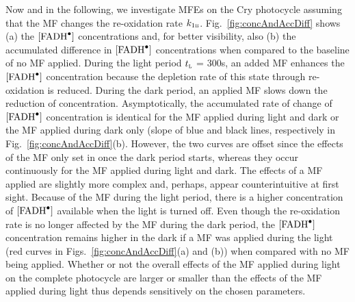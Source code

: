 \documentclass[twoside,twocolumn,9pt]{article}
\begin{document}
Now and in the following, we investigate MFEs on the Cry photocycle assuming that the MF changes the re-oxidation rate
$k_{1\textsc{b}}$. Fig.~\ref{fig:concAndAccDiff} shows (a) the $[\ce{FADH^{.}}]$ concentrations and, for better visibility, also (b)
the accumulated difference in $[\ce{FADH^{.}}]$ concentrations when compared to the baseline of no MF applied. During the light
period $t_{\textsc{l}}$ = 300s, an added MF enhances the $[\ce{FADH^{.}}]$ concentration because the depletion rate of this state
through re-oxidation is reduced. During the dark period, an applied MF slows down the reduction of concentration. Asymptotically,
the accumulated rate of change of $[\ce{FADH^{.}}]$ concentration is identical for the MF applied during light and dark or the MF
applied during dark only (slope of blue and black lines, respectively in Fig.~\ref{fig:concAndAccDiff}(b). However, the two curves
are offset since the effects of the MF only set in once the dark period starts, whereas they occur continuously for the MF applied
during light and dark. The effects of a MF applied are slightly more complex and, perhaps, appear counterintuitive at first sight.
Because of the MF during the light period, there is a higher concentration of $[\ce{FADH^{.}}]$ available when the light is turned
off. Even though the re-oxidation rate is no longer affected by the MF during the dark period, the $[\ce{FADH^{.}}]$ concentration
remains higher in the dark if a MF was applied during the light (red curves in Figs.~\ref{fig:concAndAccDiff}(a) and (b)) when
compared with no MF being applied. Whether or not the overall effects of the MF applied during light on the complete photocycle are
larger or smaller than the effects of the MF applied during light thus depends sensitively on the chosen parameters.
\end{document}
